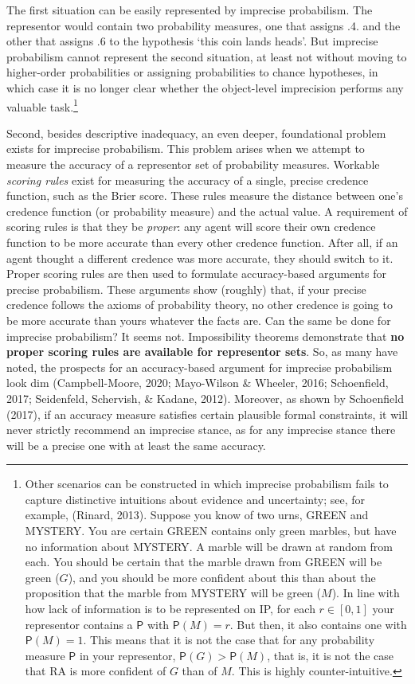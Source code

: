 \documentclass[
  10pt,
  dvipsnames,enabledeprecatedfontcommands]{scrartcl}
\newcommand{\pr}[1]{\mathsf{P}(#1)}
\begin{document}
\noindent The first situation can be easily represented by imprecise
probabilism. The representor would contain two probability measures, one
that assigns .4. and the other that assigns .6 to the hypothesis `this
coin lands heads'. But imprecise probabilism cannot represent the second
situation, at least not without moving to higher-order probabilities or
assigning probabilities to chance hypotheses, in which case it is no
longer clear whether the object-level imprecision performs any valuable
task.\footnote{Other scenarios can be constructed in which imprecise
  probabilism fails to capture distinctive intuitions about evidence and
  uncertainty; see, for example, (Rinard, 2013). Suppose you know of two
  urns, \textsf{GREEN} and \textsf{MYSTERY}. You are certain
  \textsf{GREEN} contains only green marbles, but have no information
  about \textsf{MYSTERY}. A marble will be drawn at random from each.
  You should be certain that the marble drawn from \textsf{GREEN} will
  be green (\(G\)), and you should be more confident about this than
  about the proposition that the marble from \textsf{MYSTERY} will be
  green (\(M\)). In line with how lack of information is to be
  represented on \textsf{IP}, for each \(r\in [0,1]\) your representor
  contains a \(\mathsf{P}\) with \(\pr{M}=r\). But then, it also
  contains one with \(\pr{M}=1\). This means that it is not the case
  that for any probability measure \(\mathsf{P}\) in your representor,
  \(\mathsf{P}(G) > \mathsf{P}(M)\), that is, it is not the case that RA
  is more confident of \(G\) than of \(M\). This is highly
  counter-intuitive.}

Second, besides descriptive inadequacy, an even deeper, foundational
problem exists for imprecise probabilism. This problem arises when we
attempt to measure the accuracy of a representor set of probability
measures. Workable \emph{scoring rules} exist for measuring the accuracy
of a single, precise credence function, such as the Brier score. These
rules measure the distance between one's credence function (or
probability measure) and the actual value. A requirement of scoring
rules is that they be \emph{proper}: any agent will score their own
credence function to be more accurate than every other credence
function. After all, if an agent thought a different credence was more
accurate, they should switch to it. Proper scoring rules are then used
to formulate accuracy-based arguments for precise probabilism. These
arguments show (roughly) that, if your precise credence follows the
axioms of probability theory, no other credence is going to be more
accurate than yours whatever the facts are. Can the same be done for
imprecise probabilism? It seems not. Impossibility theorems demonstrate
that \textbf{no proper scoring rules are available for representor
sets}. So, as many have noted, the prospects for an accuracy-based
argument for imprecise probabilism look dim (Campbell-Moore, 2020;
Mayo-Wilson \& Wheeler, 2016; Schoenfield, 2017; Seidenfeld, Schervish,
\& Kadane, 2012). Moreover, as shown by Schoenfield (2017), if an
accuracy measure satisfies certain plausible formal constraints, it will
never strictly recommend an imprecise stance, as for any imprecise
stance there will be a precise one with at least the same accuracy.
\end{document}
